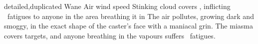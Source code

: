   {detailed,duplicated}%
  {Wane}%
  {Air}%
  {wind speed}%
  {Stinking cloud covers \spellArea, inflicting ~\glspl{fatigue} to anyone in the area breathing it in}%
  {
    The air pollutes, growing dark and smoggy, in the exact shape of the caster's face with a maniacal grin.
    The miasma covers \spellArea targets, and anyone breathing in the vapours suffers ~\glspl{fatigue}.
  }


